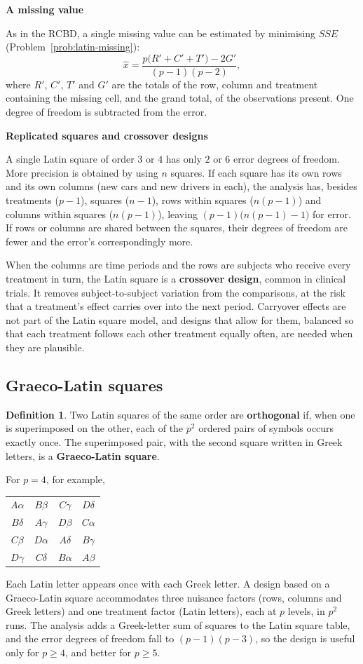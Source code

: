 \documentclass[11pt,a4paper]{article}
\numberwithin{equation}{section}
\theoremstyle{definition}
\newtheorem{defn}[thm]{Definition}
\newcommand{\subhead}[1]{%
  \par\medskip\noindent\textbf{#1}\par\nobreak\smallskip}
\begin{document}
\subhead{A missing value}
As in the RCBD, a single missing value can be estimated by minimising $SSE$ (Problem~\ref{prob:latin-missing}):
\[
\hat x = \frac{p\bigl(R' + C' + T'\bigr) - 2G'}{(p - 1)(p - 2)} ,
\]
where $R'$, $C'$, $T'$ and $G'$ are the totals of the row, column and treatment containing the missing cell, and the grand total, of the observations
present. One degree of freedom is subtracted from the error.

\subhead{Replicated squares and crossover designs}
A single Latin square of order $3$ or $4$ has only $2$ or $6$ error degrees of freedom. More precision is obtained by using $n$ squares. If each square
has its own rows and its own columns (new cars and new drivers in each), the analysis has, besides treatments ($p - 1$), squares ($n - 1$), rows within
squares ($n(p - 1)$) and columns within squares ($n(p - 1)$), leaving $(p - 1)\bigl(n(p - 1) - 1\bigr)$ for error. If rows or columns are shared between the squares,
their degrees of freedom are fewer and the error's correspondingly more.

When the columns are time periods and the rows are subjects who receive every treatment in turn, the Latin square is a \textbf{crossover
design}, common in clinical trials. It removes subject-to-subject variation from the comparisons, at the risk that a treatment's effect carries
over into the next period. Carryover effects are not part of the Latin square model, and designs that allow for them, balanced so that each
treatment follows each other treatment equally often, are needed when they are plausible.

\subsection{Graeco-Latin squares}
\begin{defn}
Two Latin squares of the same order are \textbf{orthogonal} if, when one is superimposed on the other, each of the $p^2$ ordered pairs of symbols
occurs exactly once. The superimposed pair, with the second square written in Greek letters, is a \textbf{Graeco-Latin square}.
\end{defn}

For $p = 4$, for example,
\begin{center}
\begin{tabular}{cccc}
$A\alpha$ & $B\beta$ & $C\gamma$ & $D\delta$ \\
$B\delta$ & $A\gamma$ & $D\beta$ & $C\alpha$ \\
$C\beta$ & $D\alpha$ & $A\delta$ & $B\gamma$ \\
$D\gamma$ & $C\delta$ & $B\alpha$ & $A\beta$
\end{tabular}
\end{center}
Each Latin letter appears once with each Greek letter. A design based on a Graeco-Latin square accommodates three nuisance factors (rows, columns
and Greek letters) and one treatment factor (Latin letters), each at $p$ levels, in $p^2$ runs. The analysis adds a Greek-letter sum of squares to the
Latin square table, and the error degrees of freedom fall to $(p - 1)(p - 3)$, so the design is useful only for $p \ge 4$, and better for $p \ge 5$.
\end{document}
